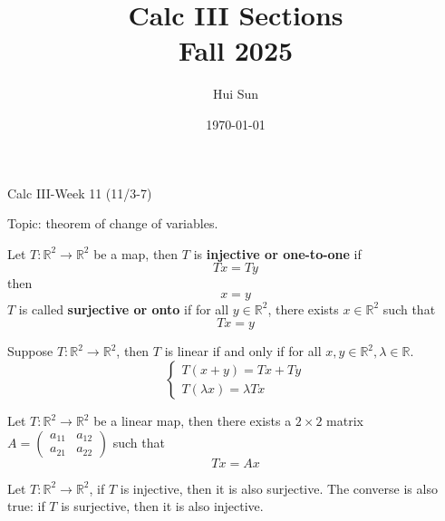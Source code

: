 \documentclass[openany]{book}
\title{Calc III Sections
\\ 
\vspace{0.4cm}
\large Fall 2025}
\date{\today}
\author{Hui Sun}
\newcommand{\R}{\mathbb{R}}
\begin{document}
\maketitle

\newpage


\begin{center}
    \Large Calc III-Week 11 (11/3-7)
\end{center}

\renewcommand\thesection{\arabic{section}}

\noindent
Topic: theorem of change of variables.




\begin{defn}
    Let $T:\R^2\to\R^2$ be a map, then $T$ is \textbf{injective or one-to-one} if 
    \begin{equation*}
        Tx=Ty
    \end{equation*}
    then
    \begin{equation*}
        x=y
    \end{equation*}
    $T$ is called \textbf{surjective or onto} if for all $y\in\R^2$, there exists $x\in\R^2$ such that 
    \begin{equation*}
        Tx=y
    \end{equation*}
\end{defn}

\begin{defn}
    Suppose $T:\R^2\to\R^2$, then $T$ is linear if and only if for all $x,y\in\R^2, \lambda\in\R$.
    \begin{equation*}
        \begin{cases}
            T(x+y)=Tx+Ty\\
            T(\lambda x)=\lambda Tx
        \end{cases}
    \end{equation*}
\end{defn}




\begin{prop}
    Let $T:\R^2\to\R^2$ be a linear map, then there exists a $2\times 2$ matrix $A=\begin{pmatrix}
        a_{11}&a_{12}\\
        a_{21}&a_{22}
    \end{pmatrix}$ such that 
    \begin{equation*}
        Tx=Ax
    \end{equation*}
\end{prop}


\begin{prop}
    Let $T:\R^2\to\R^2$, if $T$ is injective, then it is also surjective. The converse is also true: if $T$ is surjective, then it is also injective.
\end{prop}







\end{document}
